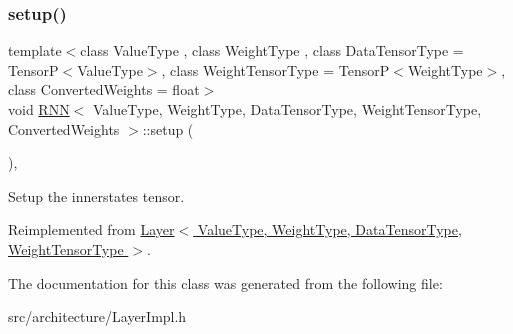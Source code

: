 \subsubsection{\texorpdfstring{setup()}{setup()}}
{\footnotesize\ttfamily template$<$class Value\+Type , class Weight\+Type , class Data\+Tensor\+Type  = Tensor\+P$<$\+Value\+Type$>$, class Weight\+Tensor\+Type  = Tensor\+P$<$\+Weight\+Type$>$, class Converted\+Weights  = float$>$ \\
void \hyperlink{classRNN}{R\+NN}$<$ Value\+Type, Weight\+Type, Data\+Tensor\+Type, Weight\+Tensor\+Type, Converted\+Weights $>$\+::setup (\begin{DoxyParamCaption}{ }\end{DoxyParamCaption})\hspace{0.3cm}{\ttfamily [inline]}, {\ttfamily [virtual]}}



Setup the innerstates tensor. 



Reimplemented from \hyperlink{classLayer_a9fafa46db51dfe6bf76dfd97ccaae831}{Layer$<$ Value\+Type, Weight\+Type, Data\+Tensor\+Type, Weight\+Tensor\+Type $>$}.



The documentation for this class was generated from the following file\+:\begin{DoxyCompactItemize}
\item 
src/architecture/Layer\+Impl.\+h\end{DoxyCompactItemize}
